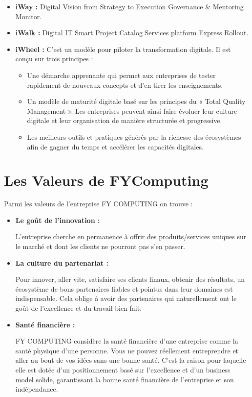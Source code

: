 \documentclass[a4paper,11pt,oneside]{report}
\begin{document}
\begin{itemize}
\item \textbf{iWay :} Digital Vision from Strategy to Execution Governance \& Mentoring  Monitor.
\item \textbf{iWalk :} Digital IT Smart Project Catalog Services platform Express Rollout.
\item \textbf{iWheel :} C'est un modèle pour piloter la transformation digitale. Il est conçu sur trois principes :

\begin{itemize}
\item Une démarche apprenante qui permet aux entreprises de tester rapidement de nouveaux concepts et d’en tirer les enseignements.

\item Un modèle de maturité digitale basé sur les principes du « Total Quality Management ». Les entreprises peuvent ainsi faire évoluer leur culture digitale et leur organisation de manière structurée et progressive.

\item Les meilleurs outils et pratiques générés par la richesse des écosystèmes afin de gagner du temps et accélérer les capacités digitales.
\end{itemize}
\end{itemize}

\section{Les Valeurs de FYComputing}
Parmi les valeurs de l’entreprise FY COMPUTING on trouve : 

\begin{itemize}
\item \textbf{Le goût de l’innovation :}

L’entreprise cherche en permanence à offrir des produits/services uniques sur le marché et dont les clients ne pourront pas s’en passer.

\item \textbf{La culture du partenariat :}

Pour innover, aller vite, satisfaire ses clients finaux, obtenir des résultats, un écosystème de bons partenaires fiables et pointus dans leur domaines est indispensable. Cela oblige à avoir des partenaires qui naturellement ont le goût de l’excellence et du travail bien fait.

\item \textbf{Santé financière :}

FY COMPUTING considère la santé financière d’une entreprise comme la santé physique d’une personne. Vous ne pouvez réellement entreprendre et aller au bout de vos idées sans une bonne santé. C’est la raison pour laquelle elle est dotée d’un positionnement basé sur l’excellence et d’un business model solide, garantissant la bonne santé financière de l’entreprise et son indépendance.
\end{itemize}
\end{document}
